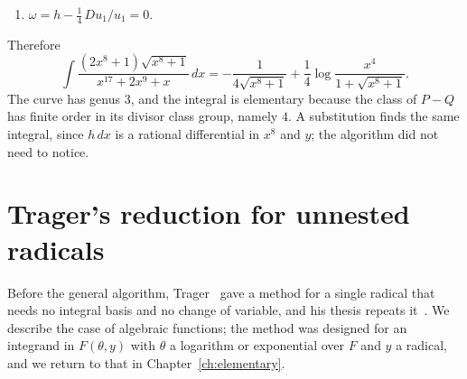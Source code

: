 \begin{example}
\begin{enumerate}
  Since $(y + 1)(y - 1) = x^8$, the function $y + 1$ vanishes
  to order $8$ at $Q$ and nowhere else, and has a pole of order $4$ at each
  infinite place, as has $x^4$. Hence
  \[
    4 \delta_1 = \Bigl( \frac{x^4}{1 + y} \Bigr) ,
  \]
  so $n_1 = 4$ and $u_1 = x^4/(1 + y)$.
\item $\omega = h - \frac14\, Du_1/u_1 = 0$.
\end{enumerate}
Therefore
\[
  \int \frac{(2x^8 + 1) \sqrt{x^8 + 1}}{x^{17} + 2x^9 + x}\, dx
  = -\frac{1}{4 \sqrt{x^8 + 1}}
    + \frac14 \log \frac{x^4}{1 + \sqrt{x^8 + 1}} .
\]
The curve has genus $3$, and the integral is elementary because the class
of $P - Q$ has finite order in its divisor class group, namely $4$. A
substitution finds the same
integral, since $h\,dx$ is a rational differential in $x^8$ and $y$; the
algorithm did not need to notice.
\end{example}

\section{Trager's reduction for unnested radicals}\label{sec:radical-trager1979}

Before the general algorithm, Trager~\cite{trager1979} gave a method for a
single radical that needs no integral basis and no change of variable, and
his thesis repeats it~\cite[Appendix~A]{trager1984}. We describe the case of
algebraic functions; the method was designed for an integrand in $F(\theta,
y)$ with $\theta$ a logarithm or exponential over $F$ and $y$ a radical, and
we return to that in Chapter~\ref{ch:elementary}.

